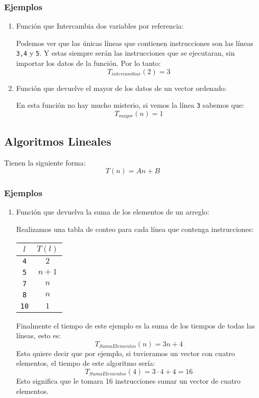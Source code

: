 \subsubsection{Ejemplos}
\begin{enumerate}
\item Función que Intercambia dos variables por referencia:

Podemos ver que las únicas líneas que contienen instrucciones son las líneas \texttt{3,4} y \texttt{5}. Y estas siempre serán las instrucciones que se ejecutaran, sin importar los datos de la función. Por lo tanto:
$$T_{intercambiar}(2)=3$$
\item Función que devuelve el mayor de los datos de un vector ordenado:

En esta función no hay mucho misterio, si vemos la línea \texttt{3} sabemos que:
$$T_{mayor}(n)=1$$
\end{enumerate}
\subsection{Algoritmos Lineales}
Tienen la siguiente forma:
$$T(n)=An+B$$
\subsubsection{Ejemplos}
\begin{enumerate}
\item Función que devuelva la suma de los elementos de un arreglo:

Realizamos una tabla de conteo para cada línea que contenga instrucciones:
\begin{center}
\begin{tabular}{|c|c|}
\hline 
$l$ & $T(l)$ \\ 
\hline 
\texttt{4} & $2$ \\ 
\texttt{5} & $n+1$ \\ 
\texttt{7} & $n$ \\ 
\texttt{8} & $n$\\ 
\texttt{10} & $1$\\ 
\hline 
\end{tabular} 
\end{center}
Finalmente el tiempo de este ejemplo es la suma de los tiempos de todas las líneas, esto es: 
$$T_{SumaElementos}(n)=3n+4$$ 
Esto quiere decir que por ejemplo, si tuvieramos un vector con cuatro elementos, el tiempo de este algoritmo sería:
$$T_{SumaElementos}(4)=3\cdot 4+4=16$$
Esto significa que le tomara 16 instrucciones sumar un vector de cuatro elementos.
\end{enumerate}
